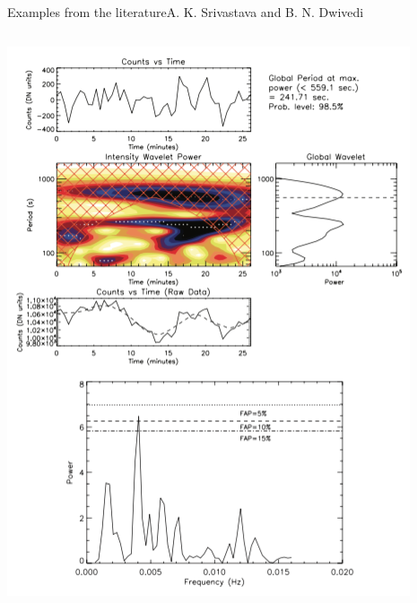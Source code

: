 \documentclass[table]{beamer}
\begin{document}
\begin{frame}{Examples from the literature}{A. K. Srivastava and B. N. Dwivedi}
    \begin{columns}
        \includegraphics[width=\textwidth]{ex1.png}
        \begin{itemize}

\end{itemize}
\end{columns}
\end{frame}
\end{document}
